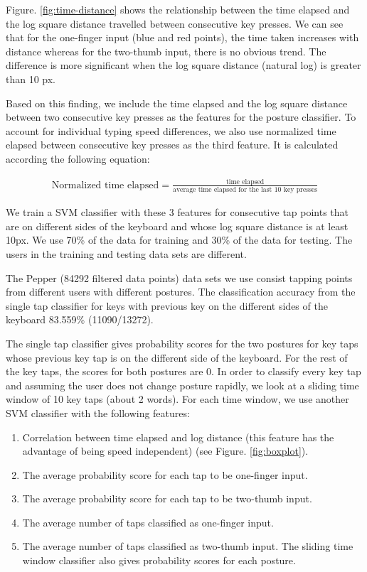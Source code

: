 \documentclass{sigchi}
\begin{document}
Figure. \ref{fig:time-distance} shows the relationship between the time elapsed 
and the log square distance travelled between consecutive key presses. We can
see that for the one-finger input (blue and red points), the time taken
increases with distance whereas for the two-thumb input, there is no obvious
trend. The difference is more significant when the log square distance (natural
log) is greater than 10 px.

Based on this finding, we include the time elapsed and the log square distance
between two consecutive key presses as the features for the posture classifier. 
To account for individual typing speed differences, we also use normalized time 
elapsed between consecutive key presses as the third feature. It is calculated according the following equation:

\begin{align}
\text{Normalized time elapsed} = \frac{\text{time elapsed}}{\text{average time
elapsed for the last 10 key presses}}
\end{align}

We train a SVM classifier with these 3 features for consecutive tap points that 
are on different sides of the keyboard and whose log square distance is at least
10px. We use 70\% of the data for training and 30\% of the
data for testing. The users in the training and testing data sets are different.

The Pepper (84292 filtered data points) data sets we use consist tapping points 
from different users with different postures. The classification accuracy from
the single tap classifier for keys with previous key on the different sides of
the keyboard 83.559\% (11090/13272).

The single tap classifier gives probability scores for the two postures for key taps whose previous key tap is on the different side of the keyboard. For the rest of the key taps, the scores for both postures are 0. In order to classify every key tap and assuming the user does not change posture rapidly, we look at a sliding time window of 10 key taps (about 2 words). For each time window, we use another SVM classifier with the following features:
\begin{enumerate}
\item Correlation between time elapsed and log distance (this feature has the
advantage of being speed independent) (see Figure. \ref{fig:boxplot}).
\item The average probability score for each tap to be one-finger input.
\item The average probability score for each tap to be two-thumb input.
\item The average number of taps classified as one-finger input.
\item The average number of taps classified as two-thumb input.
The sliding time window classifier also gives probability scores for each posture.
\end{enumerate}
\end{document}
